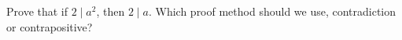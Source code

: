 Prove that if $2 \mid a^2$, then $2 \mid a$. Which proof method should we use, contradiction or contrapositive?